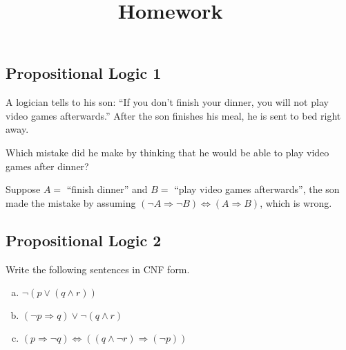 \documentclass[11pt, answers]{exam}
\title{Homework \hmwkNumber\ \hmwkType}
\date{\hmwkDue}
\begin{document}
\maketitle

%
%
\begin{questions}
\section{Propositional Logic 1}
\question

A logician tells to his son: ``If you don't finish your dinner, you will not play video games afterwards.''
After the son finishes his meal, he is sent to bed right away.

Which mistake did he make by thinking that he would be able to play video games after dinner?

\end{questions}

\begin{solution}
Suppose $A=$ “finish dinner” and $B=$ “play video games afterwards”, the son made the mistake by assuming $(\neg A\Rightarrow \neg B) \Leftrightarrow (A \Rightarrow B)$, which is wrong.
\end{solution}

%
%
\begin{questions}
\section{Propositional Logic 2}
\question

Write the following sentences in CNF form.

\begin{enumerate}[a.]
\item $\neg (p \vee (q \wedge r))$
\item $(\neg p \Rightarrow q) \vee \neg (q \wedge r)$
\item $(p \Rightarrow \neg q) \Leftrightarrow ((q \wedge \neg r) \Rightarrow (\neg p))$
\end{enumerate}

\end{questions}
\end{document}
